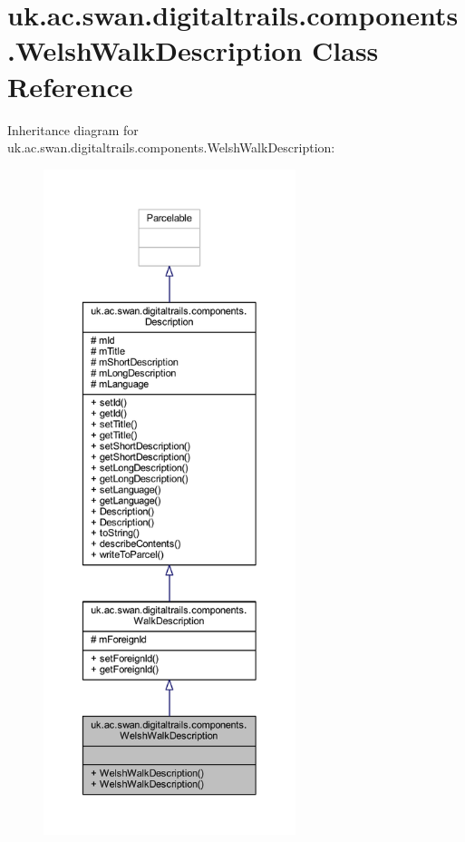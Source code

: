 \hypertarget{classuk_1_1ac_1_1swan_1_1digitaltrails_1_1components_1_1_welsh_walk_description}{\section{uk.\+ac.\+swan.\+digitaltrails.\+components.\+Welsh\+Walk\+Description Class Reference}
\label{classuk_1_1ac_1_1swan_1_1digitaltrails_1_1components_1_1_welsh_walk_description}
}


Inheritance diagram for uk.\+ac.\+swan.\+digitaltrails.\+components.\+Welsh\+Walk\+Description\+:
\nopagebreak
\begin{figure}[H]
\begin{center}
\leavevmode
\includegraphics[height=550pt]{classuk_1_1ac_1_1swan_1_1digitaltrails_1_1components_1_1_welsh_walk_description__inherit__graph}
\end{center}
\end{figure}


